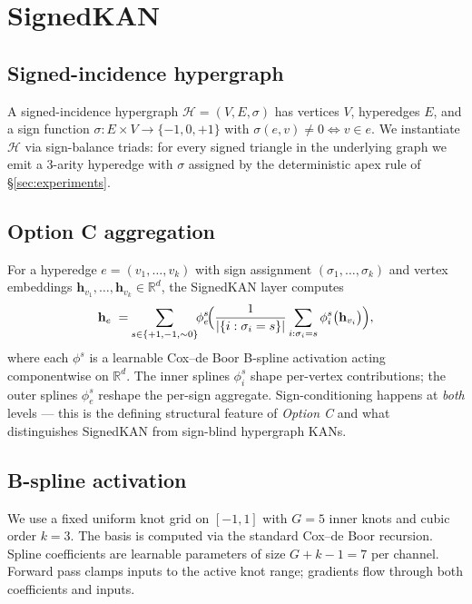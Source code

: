 \section{SignedKAN}
\label{sec:signedkan}

\subsection{Signed-incidence hypergraph}

A signed-incidence hypergraph $\mathcal{H} = (V, E, \sigma)$ has
vertices $V$, hyperedges $E$, and a sign function
$\sigma : E \times V \to \{-1, 0, +1\}$ with
$\sigma(e, v) \neq 0 \iff v \in e$. We instantiate $\mathcal{H}$ via
sign-balance triads: for every signed triangle in the underlying
graph we emit a 3-arity hyperedge with $\sigma$ assigned by the
deterministic apex rule of \S\ref{sec:experiments}.

\subsection{Option C aggregation}

For a hyperedge $e = (v_1, \dots, v_k)$ with sign assignment
$(\sigma_1, \dots, \sigma_k)$ and vertex embeddings
$\mathbf{h}_{v_1}, \dots, \mathbf{h}_{v_k} \in \mathbb{R}^{d}$, the
SignedKAN layer computes
\begin{equation}
\mathbf{h}_e \;=\; \!\!\sum_{s \in \{+1, -1, \sim 0\}}\!\! \phi_e^{s}\!\Bigl(
  \frac{1}{|\{i : \sigma_i = s\}|} \sum_{i : \sigma_i = s}
  \phi_i^{s}\bigl(\mathbf{h}_{v_i}\bigr)
\Bigr),
\label{eq:signedkan-forward}
\end{equation}
where each $\phi^{s}$ is a learnable Cox--de Boor B-spline activation
acting componentwise on $\mathbb{R}^{d}$. The inner splines
$\phi_i^{s}$ shape per-vertex contributions; the outer splines
$\phi_e^{s}$ reshape the per-sign aggregate. Sign-conditioning happens
at \emph{both} levels --- this is the defining structural feature of
\emph{Option C} and what distinguishes SignedKAN from
sign-blind hypergraph KANs.

\subsection{B-spline activation}

We use a fixed uniform knot grid on $[-1, 1]$ with $G = 5$ inner
knots and cubic order $k = 3$. The basis is computed via the standard
Cox--de Boor recursion. Spline coefficients are learnable parameters
of size $G + k - 1 = 7$ per channel. Forward pass clamps inputs to
the active knot range; gradients flow through both coefficients and
inputs.

